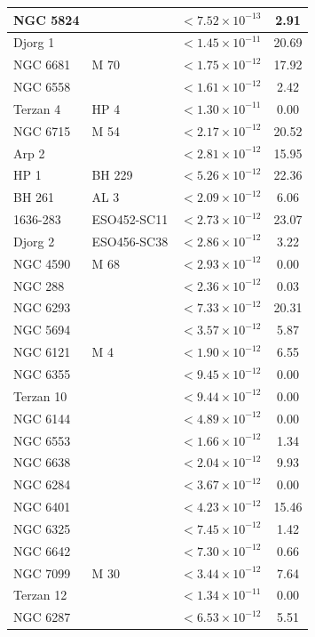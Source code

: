 \begin{longtable}{|l|l|l|c|}
NGC 5824 & & $<7.52\times 10^{-13}$ & 2.91 \\\hline
Djorg 1 & & $<1.45\times 10^{-11}$ & 20.69 \\\hline
NGC 6681 & M 70& $<1.75\times 10^{-12}$ & 17.92 \\\hline
NGC 6558 & & $<1.61\times 10^{-12}$ & 2.42 \\\hline
Terzan 4 & HP 4& $<1.30\times 10^{-11}$ & 0.00 \\\hline
NGC 6715 & M 54& $<2.17\times 10^{-12}$ & 20.52 \\\hline
Arp 2 & & $<2.81\times 10^{-12}$ & 15.95 \\\hline
HP 1 & BH 229& $<5.26\times 10^{-12}$ & 22.36 \\\hline
BH 261 & AL 3& $<2.09\times 10^{-12}$ & 6.06 \\\hline
1636-283 & ESO452-SC11 & $<2.73\times 10^{-12}$ & 23.07 \\\hline
Djorg 2 & ESO456-SC38& $<2.86\times 10^{-12}$ & 3.22 \\\hline
NGC 4590 & M 68 & $<2.93\times 10^{-12}$ & 0.00 \\\hline
NGC 288 & & $<2.36\times 10^{-12}$ & 0.03 \\\hline
NGC 6293 & & $<7.33\times 10^{-12}$ & 20.31 \\\hline
NGC 5694 & & $<3.57\times 10^{-12}$ & 5.87 \\\hline
NGC 6121 & M 4 & $<1.90\times 10^{-12}$ & 6.55 \\\hline
NGC 6355 & & $<9.45\times 10^{-12}$ & 0.00 \\\hline
Terzan 10 & & $<9.44\times 10^{-12}$ & 0.00 \\\hline
NGC 6144 & & $<4.89\times 10^{-12}$ & 0.00 \\\hline
NGC 6553 & & $<1.66\times 10^{-12}$ & 1.34 \\\hline
NGC 6638 & & $<2.04\times 10^{-12}$ & 9.93 \\\hline
NGC 6284 & & $<3.67\times 10^{-12}$ & 0.00 \\\hline
NGC 6401 & & $<4.23\times 10^{-12}$ & 15.46 \\\hline
NGC 6325 & & $<7.45\times 10^{-12}$ & 1.42 \\\hline
NGC 6642 & & $<7.30\times 10^{-12}$ & 0.66 \\\hline
NGC 7099 &M 30 & $<3.44\times 10^{-12}$ & 7.64 \\\hline
Terzan 12 & & $<1.34\times 10^{-11}$ & 0.00 \\\hline
NGC 6287 & & $<6.53\times 10^{-12}$ & 5.51 \\\hline

\end{longtable}
